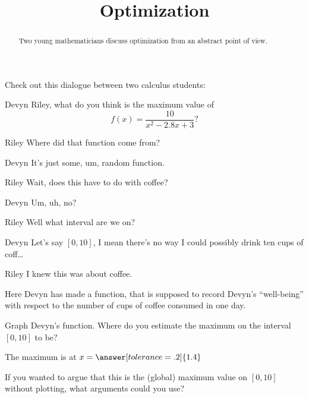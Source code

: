 \documentclass{ximera}
\title[Break-Ground:]{Optimization}
\begin{document}
\begin{abstract}
Two young mathematicians discuss optimization from an abstract point
of view.
\end{abstract}
\maketitle

Check out this dialogue between two calculus students:

\begin{dialogue}
\item[Devyn] Riley, what do you think is the maximum value of
  \[
  f(x) = \frac{10}{x^2-2.8x+3}?
  \]
\item[Riley] Where did that function come from?
\item[Devyn] It's just some, um, random function.
\item[Riley] Wait, does this have to do with coffee?
\item[Devyn] Um, uh, no?
\item[Riley] Well what interval are we on?
\item[Devyn] Let's say $[0,10]$, I mean there's no way I could possibly drink ten cups of coff\dots
\item[Riley] I knew this was about coffee.
\end{dialogue}

Here Devyn has made a function, that is supposed to record Devyn's
``well-being'' with respect to the number of cups of coffee consumed
in one day.

\begin{problem}
  Graph Devyn's function. Where do you estimate the maximum on the
  interval $[0,10]$ to be?
  \begin{prompt}
    The maximum is at $x=\answer[tolerance=.2]{1.4}$
  \end{prompt}
\end{problem}

\begin{problem}
  If you wanted to argue that this is the (global) maximum value on
  $[0,10]$ without plotting, what arguments could you use?
  \begin{freeResponse}
  \end{freeResponse}
 \end{problem}


\end{document}
